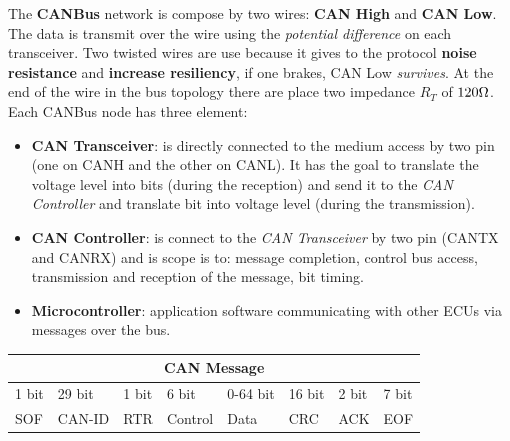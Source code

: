 The \textbf{CANBus} network is compose by two wires: \textbf{CAN High} and \textbf{CAN Low}. The data is transmit over the wire using the \textit{potential difference} on each transceiver. Two twisted wires are use because it gives to the protocol \textbf{noise resistance} and \textbf{increase resiliency}, if one brakes, CAN Low \textit{survives}. At the end of the wire in the bus topology there are place two impedance $R_T$ of $120\ohm$. Each CANBus node has three element:
\begin{itemize}[nosep]
    \item \textbf{CAN Transceiver}: is directly connected to the medium access by two pin (one on CANH and the other on CANL). It has the goal to translate the voltage level into bits (during the reception) and send it to the \textit{CAN Controller} and translate bit into voltage level (during the  transmission).
    \item \textbf{CAN Controller}: is connect to the \textit{CAN Transceiver} by two pin (CANTX and CANRX) and is scope is to: message completion, control bus access, transmission and reception of the message, bit timing.
    \item \textbf{Microcontroller}: application software communicating with other ECUs via messages over the bus.
\end{itemize}

\begin{tabular}{ ||p{1cm}|p{2cm}|p{1cm}|p{2cm}|p{2cm}|p{2cm}|p{1cm}|p{1cm}|| } 
    \hline
    \multicolumn{8}{|c|}{ \textbf{CAN Message} } \\ \hline
    1 bit & 29 bit & 1 bit & 6 bit & 0-64 bit & 16 bit & 2 bit & 7 bit\\ \hline
    SOF & CAN-ID & RTR & Control & Data & CRC & ACK & EOF \\ \hline
\end{tabular}

